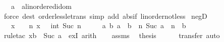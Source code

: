 \begin{isabellebody}
\ \ \ a\ {\isacharcolon}{\kern0pt}{\isacharcolon}{\kern0pt}\ {\isachardoublequoteopen}{\isacharprime}{\kern0pt}a{\isacharcolon}{\kern0pt}{\isacharcolon}{\kern0pt}linordered{\isacharunderscore}{\kern0pt}idom{\isachardoublequoteclose}\isanewline
%
\isadelimproof
\ \ %
\endisadelimproof
%
\isatagproof
{}\isamarkupfalse%
\ {\isacharparenleft}{\kern0pt}force\ dest{\isacharcolon}{\kern0pt}\ order{\isacharunderscore}{\kern0pt}less{\isacharunderscore}{\kern0pt}le{\isacharunderscore}{\kern0pt}trans\ simp\ add{\isacharcolon}{\kern0pt}\ abs{\isacharunderscore}{\kern0pt}if\ linorder{\isacharunderscore}{\kern0pt}not{\isacharunderscore}{\kern0pt}less{\isacharparenright}{\kern0pt}%
\endisatagproof
{\isafoldproof}%
%
\isadelimproof
\isanewline
%
\endisadelimproof
\isanewline
{}\isamarkupfalse%
\ negD{\isacharcolon}{\kern0pt}\isanewline
\ \ \ {\isachardoublequoteopen}x\ {\isacharless}{\kern0pt}\ {}{\isachardoublequoteclose}\ \ {\isachardoublequoteopen}{\isasymexists}n{\isachardot}{\kern0pt}\ x\ {\isacharequal}{\kern0pt}\ {\isacharminus}{\kern0pt}\ {\isacharparenleft}{\kern0pt}int\ {\isacharparenleft}{\kern0pt}Suc\ n{\isacharparenright}{\kern0pt}{\isacharparenright}{\kern0pt}{\isachardoublequoteclose}\isanewline
%
\isadelimproof
%
\endisadelimproof
%
\isatagproof
{}\isamarkupfalse%
\ {\isacharminus}{\kern0pt}\isanewline
\ \ \isamarkupfalse%
\ {\isachardoublequoteopen}{\isasymAnd}a\ b{\isachardot}{\kern0pt}\ a\ {\isacharless}{\kern0pt}\ b\ {\isasymLongrightarrow}\ {\isasymexists}n{\isachardot}{\kern0pt}\ Suc\ {\isacharparenleft}{\kern0pt}a\ {\isacharplus}{\kern0pt}\ n{\isacharparenright}{\kern0pt}\ {\isacharequal}{\kern0pt}\ b{\isachardoublequoteclose}\isanewline
\ \ \ \ \isamarkupfalse%
\ {\isacharparenleft}{\kern0pt}rule{\isacharunderscore}{\kern0pt}tac\ x{\isacharequal}{\kern0pt}{\isachardoublequoteopen}b\ {\isacharminus}{\kern0pt}\ Suc\ a{\isachardoublequoteclose}\ \ exI{\isacharparenright}{\kern0pt}\ arith\isanewline
\ \ \isamarkupfalse%
\ assms\ \isamarkupfalse%
\ {\isacharquery}{\kern0pt}thesis\isanewline
\ \ \ \ \isamarkupfalse%
\ transfer\ auto\isanewline
{}\isamarkupfalse%
%
\endisatagproof
{\isafoldproof}%
%
\isadelimproof
%
\endisadelimproof
%
\isadelimdocument
%
\endisadelimdocument
%
\isatagdocument
%
\isamarkuptrue%
%
\endisatagdocument
{\isafolddocument}%
%
\isadelimdocument
%
\endisadelimdocument

\end{isabellebody}
